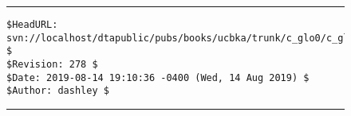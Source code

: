
\noindent\begin{figure}[!b]
\noindent\rule[-0.25in]{\textwidth}{1pt}
\begin{tiny}
\begin{verbatim}
$HeadURL: svn://localhost/dtapublic/pubs/books/ucbka/trunk/c_glo0/c_glo0.tex $
$Revision: 278 $
$Date: 2019-08-14 19:10:36 -0400 (Wed, 14 Aug 2019) $
$Author: dashley $
\end{verbatim}
\end{tiny}
\noindent\rule[0.25in]{\textwidth}{1pt}
\end{figure}

%
